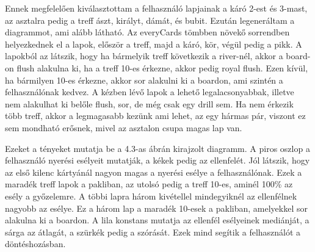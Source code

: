Ennek megfelelően kiválasztottam a felhasználó lapjainak a káró 2-est és 3-mast, az asztalra pedig a treff ászt, királyt, dámát, és bubit. Ezután legeneráltam a diagrammot, ami alább látható. Az everyCards tömbben növekő sorrendben helyezkednek el a lapok, először a treff, majd a káró, kör, végül pedig a pikk. A lapokból az látszik, hogy ha bármelyik treff következik a river-nél, akkor a board-on flush alakulna ki, ha a treff 10-es érkezne, akkor pedig royal flush. Ezen kívül, ha bármilyen 10-es érkezne, akkor sor alakulni ki a boardon, ami szintén a felhasználónak kedvez. A kézben lévő lapok a lehető legalacsonyabbak, illetve nem alakulhat ki belőle flush, sor, de még csak egy drill sem. Ha nem érkezik több treff, akkor a legmagasabb kezünk ami lehet, az egy hármas pár, viszont ez sem mondható erősnek, mivel az asztalon csupa magas lap van. 

Ezeket a tényeket mutatja be a 4.3-as ábrán kirajzolt diagramm. A piros oszlop a felhasználó nyerési esélyeit mutatják, a kékek pedig az ellenfelét. Jól látszik, hogy az első kilenc kártyánál nagyon magas a nyerési esélye a felhasználónak. Ezek a maradék treff lapok a pakliban, az utolsó pedig a treff 10-es, aminél 100\% az esély a győzelemre. A többi lapra három kivétellel mindegyiknél az ellenfélnek nagyobb az esélye. Ez a három lap a maradék 10-esek a pakliban, amelyekkel sor alakulna ki a boardon. A lila konstans mutatja az ellenfél esélyeinek mediánját, a sárga az átlagát, a szürkék pedig a szórását. Ezek mind segítik a felhasználót a döntéshozásban.